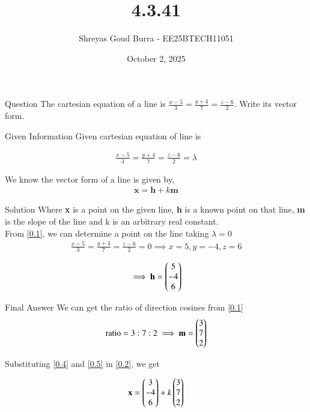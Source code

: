 \documentclass{beamer}
\title %
{4.3.41}
\date{October 2, 2025}
\author 
{Shreyas Goud Burra - EE25BTECH11051}
\begin{document}
\frame{\titlepage}

\begin{frame}{Question}
The cartesian equation of a line is $\frac{x-5}{3}=\frac{y+4}{7}=\frac{z-6}{2}$. Write its vector form.
\end{frame}
\begin{frame}{Given Information}
Given cartesian equation of line is

\begin{align}
    \frac{x-5}{3}=\frac{y+4}{7}=\frac{z-6}{2}=\lambda
    \label{0.1}
\end{align}

We know the vector form of a line is given by,
\begin{align}
    \textbf{x} = \textbf{h}+k\textbf{m}
    \label{0.2}
\end{align}
\end{frame}
\begin{frame}{Solution}
Where \textbf{x} is a point on the given line, \textbf{h} is a known point on that line, \textbf{m} is the slope of the line and k is an arbitrary real constant.\\

From \ref{0.1}, we can determine a point on the line taking $\lambda =0$
\begin{align}
    \frac{x-5}{3}=\frac{y+4}{7}=\frac{z-6}{2}=0 \implies x=5, y=-4, z=6
    \label{0.3}
\end{align}

\begin{align}
    \implies \textbf{h} = \begin{pmatrix}5\\-4\\6\end{pmatrix}
    \label{0.4}
\end{align}
\end{frame}

\begin{frame}{Final Answer}
We can get the ratio of direction cosines from \ref{0.1}
\begin{align}
    \text{ratio}=3:7:2 \implies \textbf{m} = \begin{pmatrix}3\\7\\2\end{pmatrix}
    \label{0.5}
\end{align}

Substituting \ref{0.4} and \ref{0.5} in \ref{0.2}, we get

\begin{align}
    \textbf{x} = \begin{pmatrix}3\\-4\\6\end{pmatrix} + k\begin{pmatrix}3\\7\\2\end{pmatrix}
    \label{0.6}
\end{align}
\end{frame}
\end{document}
